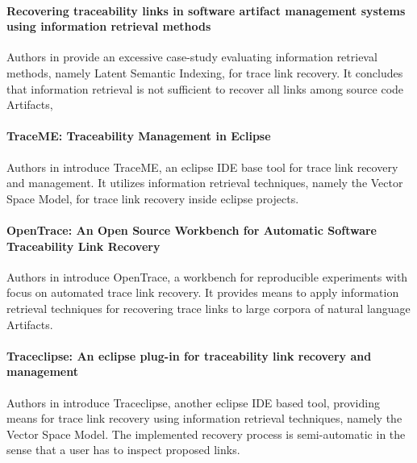 \paragraph*{Recovering traceability links in software artifact management systems using information retrieval methods}
Authors in \cite{Lucia:2007:RTL:1276933.1276934}
provide an excessive case-study evaluating information retrieval methods, namely Latent Semantic Indexing, for trace link recovery.
It concludes that information retrieval is not sufficient to recover all links among source code \glspl{Artifact}, 

\paragraph*{TraceME: Traceability Management in Eclipse}
Authors in \cite{TraceME}
introduce TraceME, an eclipse \gls{IDE} base tool for trace link recovery and management.
It utilizes information retrieval techniques, namely the Vector Space Model, for trace link recovery inside eclipse projects.

\paragraph*{OpenTrace: An Open Source Workbench for Automatic Software Traceability Link Recovery}
Authors in \cite{OpenTrace}
introduce OpenTrace, a workbench for reproducible experiments with focus on automated trace link recovery.
It provides means to apply information retrieval techniques for recovering trace links to large corpora of natural language \glspl{Artifact}.

\paragraph*{Traceclipse: An eclipse plug-in for traceability link recovery and management}
Authors in \cite{Traceclipse}
introduce Traceclipse, another eclipse \gls{IDE} based tool, providing means for trace link recovery using information retrieval techniques, namely the Vector Space Model.
The implemented recovery process is semi-automatic in the sense that a user has to inspect proposed links.

